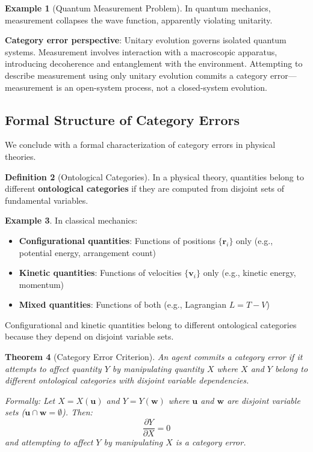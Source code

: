 \documentclass[10pt,twocolumn,letterpaper]{article}
\newtheorem{theorem}{Theorem}[section]
\theoremstyle{definition}
\newtheorem{definition}[theorem]{Definition}
\newtheorem{example}[theorem]{Example}
\theoremstyle{remark}
\newcommand{\pderiv}[2]{\frac{\partial #1}{\partial #2}}
\begin{document}
\begin{example}[Quantum Measurement Problem]
In quantum mechanics, measurement collapses the wave function, apparently violating unitarity.

\textbf{Category error perspective}: Unitary evolution governs isolated quantum systems. Measurement involves interaction with a macroscopic apparatus, introducing decoherence and entanglement with the environment. Attempting to describe measurement using only unitary evolution commits a category error—measurement is an open-system process, not a closed-system evolution.
\end{example}

\subsection{Formal Structure of Category Errors}

We conclude with a formal characterization of category errors in physical theories.

\begin{definition}[Ontological Categories]
In a physical theory, quantities belong to different \textbf{ontological categories} if they are computed from disjoint sets of fundamental variables.
\end{definition}

\begin{example}
In classical mechanics:
\begin{itemize}
\item \textbf{Configurational quantities}: Functions of positions $\{\mathbf{r}_i\}$ only (e.g., potential energy, arrangement count)
\item \textbf{Kinetic quantities}: Functions of velocities $\{\mathbf{v}_i\}$ only (e.g., kinetic energy, momentum)
\item \textbf{Mixed quantities}: Functions of both (e.g., Lagrangian $L = T - V$)
\end{itemize}

Configurational and kinetic quantities belong to different ontological categories because they depend on disjoint variable sets.
\end{example}

\begin{theorem}[Category Error Criterion]
\label{thm:category_error_criterion}
An agent commits a category error if it attempts to affect quantity $Y$ by manipulating quantity $X$ where $X$ and $Y$ belong to different ontological categories with disjoint variable dependencies.

Formally: Let $X = X(\mathbf{u})$ and $Y = Y(\mathbf{w})$ where $\mathbf{u}$ and $\mathbf{w}$ are disjoint variable sets ($\mathbf{u} \cap \mathbf{w} = \emptyset$). Then:
\begin{equation}
\pderiv{Y}{X} = 0
\end{equation}
and attempting to affect $Y$ by manipulating $X$ is a category error.
\end{theorem}
\end{document}
